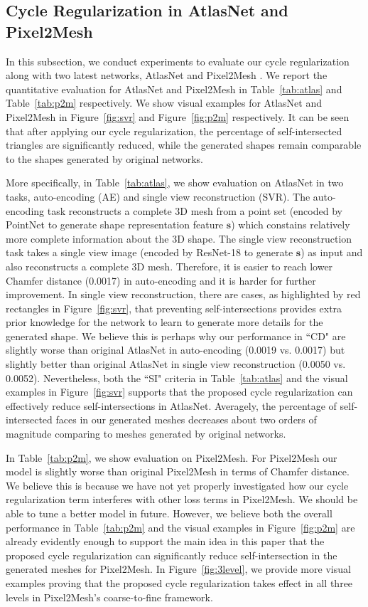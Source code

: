 \subsection{Cycle Regularization in AtlasNet and Pixel2Mesh}
In this subsection, we conduct experiments to evaluate our cycle regularization along with two latest networks, AtlasNet \cite{atlasnet} and Pixel2Mesh \cite{pixel2mesh}. We report the quantitative evaluation for AtlasNet and Pixel2Mesh in Table~\ref{tab:atlas} and Table~\ref{tab:p2m} respectively. We show visual examples for AtlasNet and Pixel2Mesh in Figure~\ref{fig:svr} and Figure~\ref{fig:p2m} respectively. It can be seen that after applying our cycle regularization, the percentage of self-intersected triangles are significantly reduced, while the generated shapes remain comparable to the shapes generated by original networks.

More specifically, in Table~\ref{tab:atlas}, we show evaluation on AtlasNet in two tasks, auto-encoding (AE) and single view reconstruction (SVR). The auto-encoding task reconstructs a complete 3D mesh from a point set (encoded by PointNet\cite{pointnet} to generate shape representation feature $\mathbf{s}$) which constains relatively more complete information about the 3D shape. The single view reconstruction task takes a single view image (encoded by ResNet-18 \cite{resnet} to generate $\mathbf{s}$) as input and also reconstructs a complete 3D mesh. Therefore, it is easier to reach lower Chamfer distance (0.0017) in auto-encoding and it is harder for further improvement.  In single view reconstruction, there are cases, as highlighted by red rectangles in Figure~\ref{fig:svr}, that preventing self-intersections provides extra prior knowledge for the network to learn to generate more details for the generated shape. We believe this is perhaps why our performance in ``CD"  are slightly worse than original AtlasNet in auto-encoding (0.0019 vs. 0.0017) but slightly better than original AtlasNet in single view reconstruction (0.0050 vs. 0.0052). Nevertheless, both the ``SI" criteria in Table~\ref{tab:atlas} and the visual examples in Figure~\ref{fig:svr} supports that the proposed cycle regularization can effectively reduce self-intersections in AtlasNet. Averagely, the percentage of self-intersected faces in our generated meshes decreases about two orders of magnitude comparing to meshes generated by original networks.

In Table~\ref{tab:p2m}, we show evaluation on Pixel2Mesh. For Pixel2Mesh our model is slightly worse than original Pixel2Mesh in terms of Chamfer distance. We believe this is because we have not yet properly investigated how our cycle regularization term interferes with other loss terms in Pixel2Mesh. We should be able to tune a better model in future. However, we believe both the overall performance in Table~\ref{tab:p2m} and the visual examples in Figure~\ref{fig:p2m} are already evidently enough to support the main idea in this paper that the proposed cycle regularization can significantly reduce self-intersection in the generated meshes for Pixel2Mesh. In Figure~\ref{fig:3level}, we provide more visual examples proving that the proposed cycle regularization takes effect in all three levels in Pixel2Mesh's coarse-to-fine framework.

